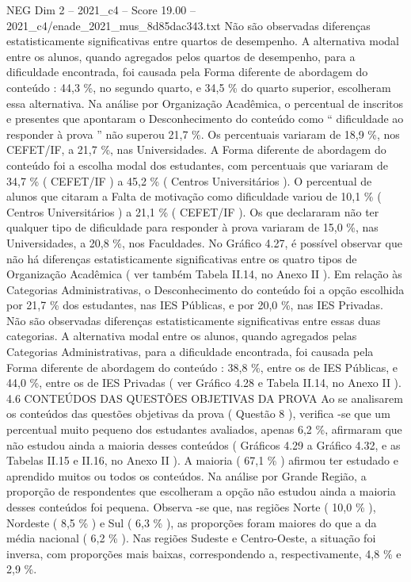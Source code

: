 \begin{textsample}{NEG Dim 2 – 2021\_c4 – Score 19.00 – 2021\_c4/enade\_2021\_mus\_8d85dac343.txt}
Não são observadas diferenças estatisticamente significativas entre quartos de desempenho.
A alternativa modal entre os alunos, quando agregados pelos quartos de desempenho, para a dificuldade encontrada, foi causada pela Forma diferente de abordagem do conteúdo : 44,3 \%, no segundo quarto, e 34,5 \% do quarto superior, escolheram essa alternativa.
Na análise por Organização Acadêmica, o percentual de inscritos e presentes que apontaram o Desconhecimento do conteúdo como “ dificuldade ao responder à prova ” não superou 21,7 \%.
Os percentuais variaram de 18,9 \%, nos CEFET/IF, a 21,7 \%, nas Universidades.
A Forma diferente de abordagem do conteúdo foi a escolha modal dos estudantes, com percentuais que variaram de 34,7 \% ( CEFET/IF ) a 45,2 \% ( Centros Universitários ).
O percentual de alunos que citaram a Falta de motivação como dificuldade variou de 10,1 \% ( Centros Universitários ) a 21,1 \% ( CEFET/IF ).
Os que declararam não ter qualquer tipo de dificuldade para responder à prova variaram de 15,0 \%, nas Universidades, a 20,8 \%, nos Faculdades.
No Gráfico 4.27, é possível observar que não há diferenças estatisticamente significativas entre os quatro tipos de Organização Acadêmica ( ver também Tabela II.14, no Anexo II ).
Em relação às Categorias Administrativas, o Desconhecimento do conteúdo foi a opção escolhida por 21,7 \% dos estudantes, nas IES Públicas, e por 20,0 \%, nas IES Privadas.
Não são observadas diferenças estatisticamente significativas entre essas duas categorias.
A alternativa modal entre os alunos, quando agregados pelas Categorias Administrativas, para a dificuldade encontrada, foi causada pela Forma diferente de abordagem do conteúdo : 38,8 \%, entre os de IES Públicas, e 44,0 \%, entre os de IES Privadas ( ver Gráfico 4.28 e Tabela II.14, no Anexo II ). 4.6 CONTEÚDOS DAS QUESTÕES OBJETIVAS DA PROVA Ao se analisarem os conteúdos das questões objetivas da prova ( Questão 8 ), verifica -se que um percentual muito pequeno dos estudantes avaliados, apenas 6,2 \%, afirmaram que não estudou ainda a maioria desses conteúdos ( Gráficos 4.29 a Gráfico 4.32, e as Tabelas II.15 e II.16, no Anexo II ).
A maioria ( 67,1 \% ) afirmou ter estudado e aprendido muitos ou todos os conteúdos.
Na análise por Grande Região, a proporção de respondentes que escolheram a opção não estudou ainda a maioria desses conteúdos foi pequena.
Observa -se que, nas regiões Norte ( 10,0 \% ), Nordeste ( 8,5 \% ) e Sul ( 6,3 \% ), as proporções foram maiores do que a da média nacional ( 6,2 \% ).
Nas regiões Sudeste e Centro-Oeste, a situação foi inversa, com proporções mais baixas, correspondendo a, respectivamente, 4,8 \% e 2,9 \%.

\end{textsample}
